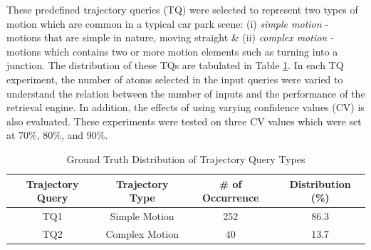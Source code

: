 These predefined trajectory queries (TQ) were selected to represent two types
of motion which are common in a typical car park scene: (i) \textit{simple
motion} - motions that are simple in nature, moving straight \& (ii)
\textit{complex motion} - motions which contains two or more motion elements
such as turning into a junction. The distribution of these TQs are tabulated in Table \ref{table:motiondist}. In each TQ experiment, the number of atoms selected in the input queries were varied to understand the relation between the number of inputs and the performance of the retrieval engine. In addition, the effects of using varying confidence values (CV) is also evaluated. These experiments were tested on three CV values which were set at 70\%, 80\%, and 90\%.
\begin{table}[tb!]
\centering
  \caption{Ground Truth Distribution of Trajectory Query Types}
\label{table:motiondist}
\begin{tabular}{cccc}
\toprule
Trajectory Query &  Trajectory Type & \# of Occurrence & Distribution (\%)   \\
\midrule
TQ1       & Simple Motion       & 252 & 86.3   \\
TQ2      & Complex Motion       & 40 & 13.7  \\
\bottomrule
\end{tabular}
\end{table}
